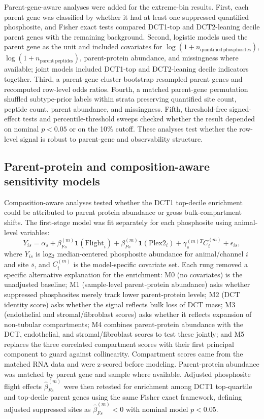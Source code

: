 \documentclass[11pt]{article}
\begin{document}
Parent-gene-aware analyses were added for the extreme-bin results. First, each parent gene was classified by whether it had at least one suppressed quantified phosphosite, and Fisher exact tests compared DCT1-top and DCT2-leaning decile parent genes with the remaining background. Second, logistic models used the parent gene as the unit and included covariates for $\log(1+n_{\mathrm{quantified\ phosphosites}})$, $\log(1+n_{\mathrm{parent\ peptides}})$, parent-protein abundance, and missingness where available; joint models included DCT1-top and DCT2-leaning decile indicators together. Third, a parent-gene cluster bootstrap resampled parent genes and recomputed row-level odds ratios. Fourth, a matched parent-gene permutation shuffled subtype-prior labels within strata preserving quantified site count, peptide count, parent abundance, and missingness. Fifth, threshold-free signed-effect tests and percentile-threshold sweeps checked whether the result depended on nominal $p<0.05$ or on the 10\% cutoff. These analyses test whether the row-level signal is robust to parent-gene and observability structure.

\subsection{Parent-protein and composition-aware sensitivity models}

Composition-aware analyses tested whether the DCT1 top-decile enrichment could be attributed to parent protein abundance or gross bulk-compartment shifts. The first-stage model was fit separately for each phosphosite using animal-level variables:
\[
Y_{i s}=\alpha_s+\beta_{Fs}^{(m)}\mathbf{1}(\mathrm{Flight}_i)+\beta_{Ps}^{(m)}\mathbf{1}(\mathrm{Plex2}_i)
+\gamma_s^{(m)T}C_i^{(m)}+\epsilon_{i s},
\]
where $Y_{is}$ is log$_2$ median-centered phosphosite abundance for animal/channel $i$ and site $s$, and $C_i^{(m)}$ is the model-specific covariate set. Each rung removed a specific alternative explanation for the enrichment: M0 (no covariates) is the unadjusted baseline; M1 (sample-level parent-protein abundance) asks whether suppressed phosphosites merely track lower parent-protein levels; M2 (DCT identity score) asks whether the signal reflects bulk loss of DCT mass; M3 (endothelial and stromal/fibroblast scores) asks whether it reflects expansion of non-tubular compartments; M4 combines parent-protein abundance with the DCT, endothelial, and stromal/fibroblast scores to test these jointly; and M5 replaces the three correlated compartment scores with their first principal component to guard against collinearity. Compartment scores came from the matched RNA data and were z-scored before modeling. Parent-protein abundance was matched by parent gene and sample where available. Adjusted phosphosite flight effects $\hat{\beta}_{Fs}^{(m)}$ were then retested for enrichment among DCT1 top-quartile and top-decile parent genes using the same Fisher exact framework, defining adjusted suppressed sites as $\hat{\beta}_{Fs}^{(m)}<0$ with nominal model $p<0.05$.
\end{document}
